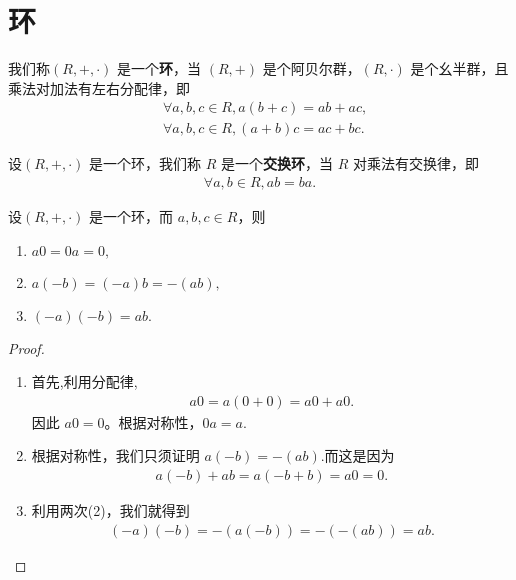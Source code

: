 \documentclass[../../main.tex]{subfiles}
\begin{document}
\section{环}

\begin{definition}[环]
我们称$(R, +, \cdot)$ 是一个\textbf{环}，当 $(R, +)$ 是个阿贝尔群，$(R, \cdot)$ 是个幺半群，且乘法对加法有左右分配律，即
\begin{align*}
&\forall a,b,c\in R, a(b + c)=ab + ac ,\\
&\forall a,b,c\in R, (a + b)c=ac + bc .
\end{align*} 
\end{definition}

\begin{definition}[交换环]
设$(R, +, \cdot)$ 是一个环，我们称 $R$ 是一个\textbf{交换环}，当 $R$ 对乘法有交换律，即
\begin{align*}
\forall a,b\in R, ab = ba.
\end{align*}
\end{definition}

\begin{proposition}
设$(R, +, \cdot)$ 是一个环，而 $a,b,c\in R$，则
\begin{enumerate}[(1)]
\item $a0 = 0a = 0,$

\item $a(-b)=(-a)b=-(ab),$

\item $(-a)(-b)=ab.$
\end{enumerate}
\end{proposition}
\begin{proof}
\begin{enumerate}[(1)]
\item 首先,利用分配律,
\begin{align*}
a0 = a(0 + 0)=a0 + a0.
\end{align*}
因此 $a0 = 0$。根据对称性，$0a = a$.

\item 根据对称性，我们只须证明 $a(-b)=-(ab)$.而这是因为
\begin{align*}
a(-b)+ab = a(-b + b)=a0 = 0.
\end{align*}

\item 利用两次(2)，我们就得到
\begin{align*}
(-a)(-b)=-(a(-b))=-(-(ab)) = ab.
\end{align*} 
\end{enumerate}
\end{proof}
\end{document}
